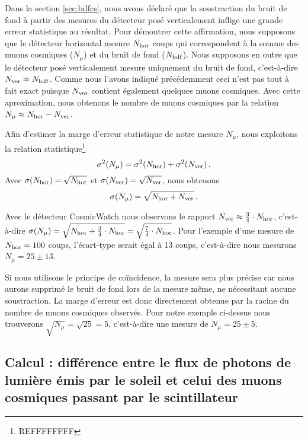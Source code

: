 \documentclass[a4paper, 12pt]{article}
\begin{document}
\begin{spacing}{1.5}
Dans la section \ref{sec:bdfcs}, nous avons déclaré que la soustraction du bruit de fond à partir des mesures du détecteur posé verticalement inflige une grande erreur statistique au résultat. Pour démontrer cette affirmation, nous supposons que le détecteur horizontal mesure $N_{\rm hor}$ coups qui correspondent à la somme des muons cosmiques ($N_\mu$) et du bruit de fond ($N_{\rm bdf}$). Nous supposons en outre que le détecteur posé verticalement mesure uniquement du bruit de fond, c'est-à-dire $N_{\rm ver} \approx N_{\rm bdf}$. Comme nous l'avons indiqué précédemment ceci n'est pas tout à fait exact puisque $N_{\rm ver}$ contient également quelques muons cosmiques. Avec cette aproximation, nous obtenons le nombre de muons cosmiques par la relation $N_\mu \approx N_{\rm hor} - N_{\rm ver}$.

Afin d'estimer la marge d'erreur statistique de notre mesure $N_\mu$, nous exploitons la relation statistique\footnote{REFFFFFFFF}
\begin{equation}
\sigma^2(N_\mu) = \sigma^2(N_{\rm hor}) + \sigma^2(N_{\rm ver})\,. \label{eq:math1}
\end{equation}
Avec $\sigma(N_{\rm hor}) = \sqrt{N_{\rm hor}}$ et $\sigma(N_{\rm ver}) = \sqrt{N_{\rm ver}}$, nous obtenons
\begin{equation}
\sigma(N_\mu) = \sqrt{N_{\rm hor} + N_{\rm ver}}\,.
\end{equation}

Avec le détecteur CosmicWatch nous observons le rapport $N_{\rm ver} \approx \frac{3}{4}\cdot N_{\rm hor}$, c'est-à-dire $\sigma(N_\mu) = \sqrt{N_{\rm hor} + \frac{3}{4}\cdot N_{\rm hor}} = \sqrt{\frac{7}{4}\cdot N_{\rm hor}}$. Pour l'exemple d'une mesure de $N_{\rm hor} =100$ coups, l'écart-type serait égal à 13 coups, c'est-à-dire nous mesurons $N_\mu = 25 \pm 13$.

Si nous utilisons le principe de coïncidence, la mesure sera plus précise car nous aurons supprimé le bruit de fond lors de la mesure même, ne nécessitant aucune soustraction. La marge d'erreur est donc directement obtenue par la racine du nombre de muons cosmiques observés. Pour notre exemple ci-dessus nous trouverons $\sqrt{N_\mu} = \sqrt{25} = 5$, c'est-à-dire une mesure de $N_\mu = 25 \pm 5$.

\subsection{Calcul : différence entre le flux de photons de lumière émis par le soleil et celui des muons cosmiques passant par le scintillateur}


\end{spacing}
\end{document}
